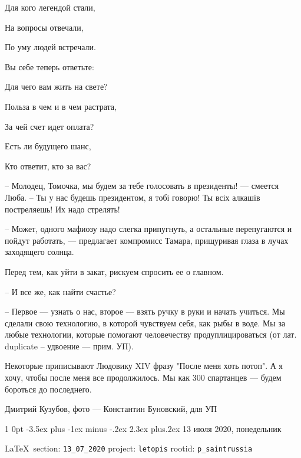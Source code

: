 \documentclass[a4paper,11pt]{extreport}
\makeatletter
\renewcommand\section{%
  \clearpage
  \@startsection{section}%
    {1}%
    {0pt}%
    {-3.5ex plus -1ex minus -.2ex}%
    {2.3ex plus.2ex}%
    {\centering\normalfont\Huge\bfseries}%
}
\makeatother
\begin{document}
Для кого легендой стали,

На вопросы отвечали,

По уму людей встречали.

Вы себе теперь ответьте:

Для чего вам жить на свете?

Польза в чем и в чем растрата,

За чей счет идет оплата?

Есть ли будущего шанс,

Кто ответит, кто за вас?

– Молодец, Томочка, мы будем за тебе голосовать в президенты! --- смеется Люба. –
Ты у нас будешь президентом, я тобі говорю! Ты всіх алкашів постреляешь! Их
надо стрелять!

– Может, одного мафиозу надо слегка припугнуть, а остальные перепугаются и
пойдут работать, --- предлагает компромисс Тамара, прищуривая глаза в лучах
заходящего солнца.

Перед тем, как уйти в закат, рискуем спросить ее о главном.

– И все же, как найти счастье?

– Первое --- узнать о нас, второе --- взять ручку в руки и начать учиться. Мы
сделали свою технологию, в которой чувствуем себя, как рыбы в воде. Мы за любые
технологии, которые помогают человечеству продуплицироваться (от лат. duplicate
– удвоение --- прим. УП). 

Некоторые приписывают Людовику XIV фразу "После меня хоть потоп". А я хочу,
чтобы после меня все продолжилось. Мы как 300 спартанцев --- будем бороться до
последнего.

Дмитрий Кузубов, фото --- Константин Буновский, для УП
  

 
 

\section{13 июля 2020, понедельник}
\label{sec:13_07_2020}



\vspace{0.5cm}
{\ifDEBUG\small\LaTeX~section: \verb|13_07_2020| project: \verb|letopis| rootid: \verb|p_saintrussia|\fi}
\vspace{0.5cm}
\end{document}
